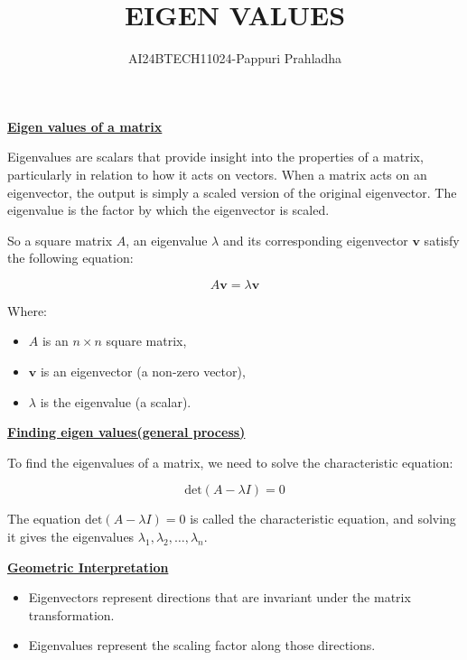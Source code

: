\documentclass[journal]{IEEEtran}
\begin{document}

\vspace{3cm}

\title{EIGEN VALUES }
\author{AI24BTECH11024-Pappuri Prahladha}
{\let\newpage\relax\maketitle}

\renewcommand{\thefigure}{\theenumi}
\renewcommand{\thetable}{\theenumi}
\setlength{\intextsep}{10pt} %


\renewcommand{\thetable}{\theenumi}
\underline{\textbf{Eigen values of a matrix}}

Eigenvalues are scalars that provide insight into the properties of a matrix, particularly in relation to how it acts on vectors. When a matrix acts on an eigenvector, the output is simply a scaled version of the original eigenvector. The eigenvalue is the factor by which the eigenvector is scaled.

So a square matrix $ A $, an eigenvalue $ \lambda $ and its corresponding eigenvector $ \mathbf{v} $ satisfy the following equation:

\[
A \mathbf{v} = \lambda \mathbf{v}
\]

Where:
\begin{itemize}
    \item \( A \) is an \( n \times n \) square matrix,
    \item \( \mathbf{v} \) is an eigenvector (a non-zero vector),
    \item \( \lambda \) is the eigenvalue (a scalar).
\end{itemize}

\underline{\textbf{Finding eigen values(general process)}}

To find the eigenvalues of a matrix, we  need to solve the characteristic equation:

\[
\text{det}(A - \lambda I) = 0
\]


The equation $\text{det}(A - \lambda I) = 0 $ is called the characteristic equation, and solving it gives the eigenvalues $ \lambda_1, \lambda_2, \dots, \lambda_n $.

\underline{\textbf{Geometric Interpretation}}

\begin{itemize}
    \item Eigenvectors represent directions that are invariant under the matrix transformation.
    \item Eigenvalues represent the scaling factor along those directions.
\end{itemize}
\end{document}

